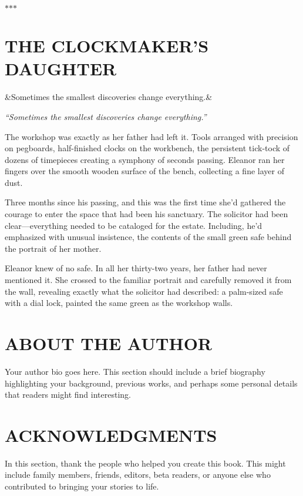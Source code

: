 \documentclass[11pt,oneside,openany]{memoir}
\newcommand{\storyseparator}{
    \begin{center}
        \vspace{1.5cm}
        {\color{chaptercolor}$\ast$\quad$\ast$\quad$\ast$}
        \vspace{1.5cm}
    \end{center}
}
\newcommand{\story}[3][]{
    \clearpage
    \chapter{#2}
    
    \ifx&#1&
    \else
        \begin{center}
            \vspace{-1cm}
            \textit{``#1''}
            \vspace{0.5cm}
        \end{center}
    \fi
    
    #3
}
\begin{document}
\storyseparator

\story[Sometimes the smallest discoveries change everything.]{THE CLOCKMAKER'S DAUGHTER}{
    The workshop was exactly as her father had left it. Tools arranged with precision on pegboards, half-finished clocks on the workbench, the persistent tick-tock of dozens of timepieces creating a symphony of seconds passing. Eleanor ran her fingers over the smooth wooden surface of the bench, collecting a fine layer of dust.
    
    Three months since his passing, and this was the first time she'd gathered the courage to enter the space that had been his sanctuary. The solicitor had been clear—everything needed to be cataloged for the estate. Including, he'd emphasized with unusual insistence, the contents of the small green safe behind the portrait of her mother.
    
    Eleanor knew of no safe. In all her thirty-two years, her father had never mentioned it. She crossed to the familiar portrait and carefully removed it from the wall, revealing exactly what the solicitor had described: a palm-sized safe with a dial lock, painted the same green as the workshop walls.
}

\backmatter

\chapter{ABOUT THE AUTHOR}
Your author bio goes here. This section should include a brief biography highlighting your background, previous works, and perhaps some personal details that readers might find interesting.

\chapter{ACKNOWLEDGMENTS}
In this section, thank the people who helped you create this book. This might include family members, friends, editors, beta readers, or anyone else who contributed to bringing your stories to life.
\end{document}
